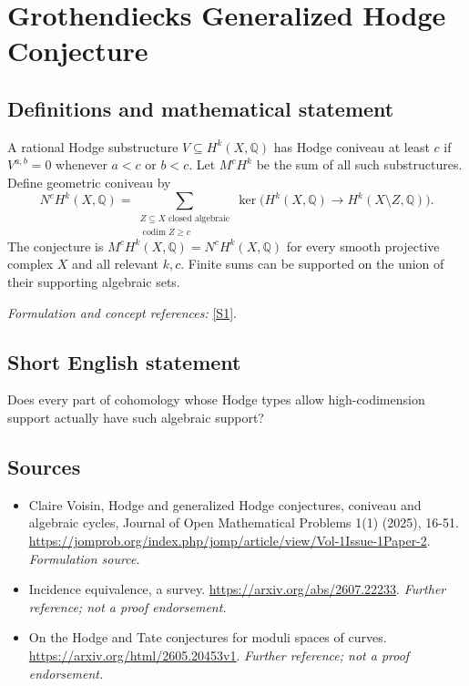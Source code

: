 \documentclass[11pt]{article}
\begin{document}
\section*{\texorpdfstring{Grothendiecks Generalized Hodge Conjecture}{Grothendiecks Generalized Hodge Conjecture}}\label{24}
\subsection{Definitions and mathematical statement}
A rational Hodge substructure $V\subseteq H^k(X,{\mathbb{Q}})$ has Hodge coniveau at least $c$ if $V^{a,b}=0$ whenever $a<c$ or $b<c$. Let $M^cH^k$ be the sum of all such substructures. Define geometric coniveau by
\[
 N^cH^k(X,{\mathbb{Q}})=\sum_{\substack{Z\subseteq X\text{ closed algebraic}\\ \operatorname{codim}Z\ge c}}
 \ker\bigl(H^k(X,{\mathbb{Q}})\to H^k(X\setminus Z,{\mathbb{Q}})\bigr).
\]
The conjecture is $M^cH^k(X,{\mathbb{Q}})=N^cH^k(X,{\mathbb{Q}})$ for every smooth projective complex $X$ and all relevant $k,c$. Finite sums can be supported on the union of their supporting algebraic sets.
\par\smallskip\textit{Formulation and concept references:} \href{https://jomprob.org/index.php/jomp/article/view/Vol-1Issue-1Paper-2}{[S1]}.

\subsection{Short English statement}
Does every part of cohomology whose Hodge types allow high-codimension support actually have such algebraic support?
\subsection{Sources}
\begin{itemize}
\item[S1]Claire Voisin, Hodge and generalized Hodge conjectures, coniveau and algebraic cycles, Journal of Open Mathematical Problems 1(1) (2025), 16-51.
\url{https://jomprob.org/index.php/jomp/article/view/Vol-1Issue-1Paper-2}.
\textit{Formulation source.}
\item[S2]Incidence equivalence, a survey.
\url{https://arxiv.org/abs/2607.22233}.
\textit{Further reference; not a proof endorsement.}
\item[S3]On the Hodge and Tate conjectures for moduli spaces of curves.
\url{https://arxiv.org/html/2605.20453v1}.
\textit{Further reference; not a proof endorsement.}
\end{itemize}
\end{document}
